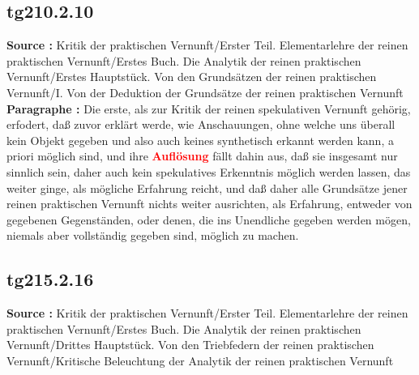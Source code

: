 \documentclass[a4paper,12pt,twoside]{book}
\newcommand{\match}[1]{\textcolor{red}{\textbf{#1}}}
\begin{document}
	\subsection*{tg210.2.10} 
	\textbf{Source : }Kritik der praktischen Vernunft/Erster Teil. Elementarlehre der reinen praktischen Vernunft/Erstes Buch. Die Analytik der reinen praktischen Vernunft/Erstes Hauptstück. Von den Grundsätzen der reinen praktischen Vernunft/I. Von der Deduktion der Grundsätze der reinen praktischen Vernunft\\  
	
	\noindent\textbf{Paragraphe : }Die erste, als zur Kritik der reinen spekulativen Vernunft gehörig, erfodert, daß zuvor erklärt werde, wie Anschauungen,  ohne welche uns überall kein Objekt gegeben und also auch keines synthetisch erkannt werden kann, a priori möglich sind, und ihre \match{Auflösung} fällt dahin aus, daß sie insgesamt nur sinnlich sein, daher auch kein spekulatives Erkenntnis möglich werden lassen, das weiter ginge, als mögliche Erfahrung reicht, und daß daher alle Grundsätze jener reinen praktischen Vernunft nichts weiter ausrichten, als Erfahrung, entweder von gegebenen Gegenständen, oder denen, die ins Unendliche gegeben werden mögen, niemals aber vollständig gegeben sind, möglich zu machen. 
	
	\subsection*{tg215.2.16} 
	\textbf{Source : }Kritik der praktischen Vernunft/Erster Teil. Elementarlehre der reinen praktischen Vernunft/Erstes Buch. Die Analytik der reinen praktischen Vernunft/Drittes Hauptstück. Von den Triebfedern der reinen praktischen Vernunft/Kritische Beleuchtung der Analytik der reinen praktischen Vernunft\\  
	
\end{document}
